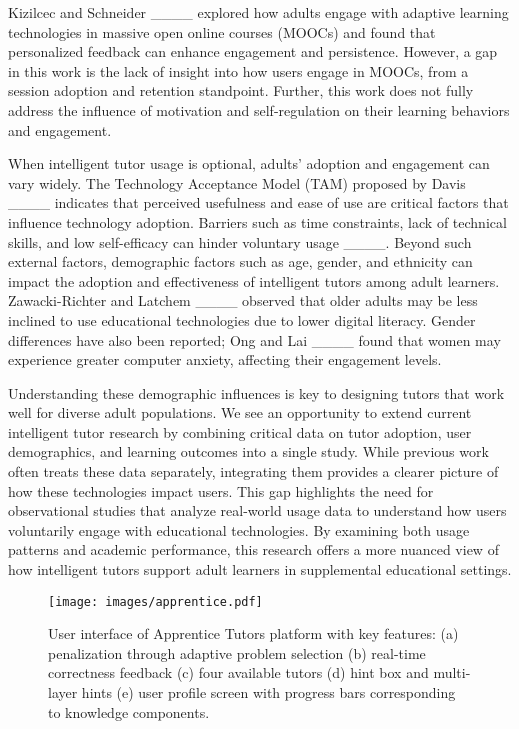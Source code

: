 Kizilcec and Schneider ____ explored how adults engage with adaptive learning technologies in massive open online courses (MOOCs) and found that personalized feedback can enhance engagement and persistence. However, a gap in this work is the lack of  insight into how users engage in MOOCs, from a session adoption and retention standpoint. Further, this work does not fully address the influence of motivation and self-regulation on their learning behaviors and engagement. 


When intelligent tutor usage is optional, adults' adoption and engagement can vary widely. The Technology Acceptance Model (TAM) proposed by Davis ____ indicates that perceived usefulness and ease of use are critical factors that influence technology adoption. Barriers such as time constraints, lack of technical skills, and low self-efficacy can hinder voluntary usage ____. Beyond such external factors, demographic factors such as age, gender, and ethnicity can impact the adoption and effectiveness of intelligent tutors among adult learners. Zawacki-Richter and Latchem ____ observed that older adults may be less inclined to use educational technologies due to lower digital literacy. Gender differences have also been reported; Ong and Lai ____ found that women may experience greater computer anxiety, affecting their engagement levels. 

Understanding these demographic influences is key to designing tutors that work well for diverse adult populations. We see an opportunity to extend current intelligent tutor research by combining critical data on tutor adoption, user demographics, and learning outcomes into a single study. While previous work often treats these data separately, integrating them provides a clearer picture of how these technologies impact users. This gap highlights the need for observational studies that analyze real-world usage data to understand how users voluntarily engage with educational technologies. By examining both usage patterns and academic performance, this research offers a more nuanced view of how intelligent tutors support adult learners in supplemental educational settings.

\begin{figure*}
    \centering
    \texttt{[image: images/apprentice.pdf]} %
    \caption{User interface of Apprentice Tutors platform with key features: (a) penalization through adaptive problem selection (b) real-time correctness feedback (c) four available tutors (d) hint box and multi-layer hints (e) user profile screen with progress bars corresponding to knowledge components.}
    \label{fig:apprentice}
\end{figure*}